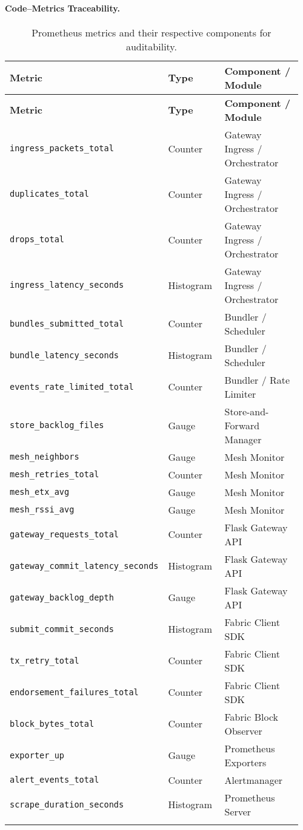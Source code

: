 \documentclass[12pt]{article}
\newcommand{\code}[1]{\texttt{\nolinkurl{#1}}}
\newcommand{\code}[1]{\texttt{\nolinkurl{#1}}}
\begin{document}
\paragraph{Code--Metrics Traceability.}
\begin{longtable}{@{}L{0.36\linewidth}L{0.22\linewidth}L{0.38\linewidth}@{}}
\toprule
\textbf{Metric} & \textbf{Type} & \textbf{Component / Module} \\
\midrule
\endfirsthead
\toprule
\textbf{Metric} & \textbf{Type} & \textbf{Component / Module} \\
\midrule
\endhead
\code{ingress_packets_total} & Counter & Gateway Ingress / Orchestrator \\
\code{duplicates_total} & Counter & Gateway Ingress / Orchestrator \\
\code{drops_total} & Counter & Gateway Ingress / Orchestrator \\
\code{ingress_latency_seconds} & Histogram & Gateway Ingress / Orchestrator \\
\code{bundles_submitted_total} & Counter & Bundler / Scheduler \\
\code{bundle_latency_seconds} & Histogram & Bundler / Scheduler \\
\code{events_rate_limited_total} & Counter & Bundler / Rate Limiter \\
\code{store_backlog_files} & Gauge & Store-and-Forward Manager \\
\code{mesh_neighbors} & Gauge & Mesh Monitor \\
\code{mesh_retries_total} & Counter & Mesh Monitor \\
\code{mesh_etx_avg} & Gauge & Mesh Monitor \\
\code{mesh_rssi_avg} & Gauge & Mesh Monitor \\
\code{gateway_requests_total} & Counter & Flask Gateway API \\
\code{gateway_commit_latency_seconds} & Histogram & Flask Gateway API \\
\code{gateway_backlog_depth} & Gauge & Flask Gateway API \\
\code{submit_commit_seconds} & Histogram & Fabric Client SDK \\
\code{tx_retry_total} & Counter & Fabric Client SDK \\
\code{endorsement_failures_total} & Counter & Fabric Client SDK \\
\code{block_bytes_total} & Counter & Fabric Block Observer \\
\code{exporter_up} & Gauge & Prometheus Exporters \\
\code{alert_events_total} & Counter & Alertmanager \\
\code{scrape_duration_seconds} & Histogram & Prometheus Server \\
\bottomrule
\caption{Prometheus metrics and their respective components for auditability.}
\end{longtable}
\end{document}
